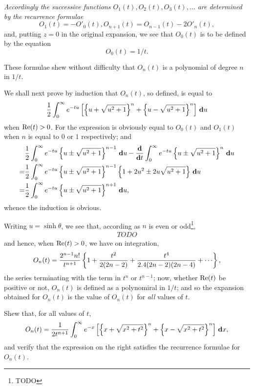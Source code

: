 \documentclass{book}
\begin{document}
%
%
\emph{Accordingly the successive functions $O_1(t), O_2(t), O_3(t),
  \ldots$ are determined by the recurrence formulae}
$$
O_1(t) = -O'_0(t),
O_{n+1}(t) = O_{n-1}(t) - 2O'_n(t),
$$
and, putting $z=0$ in the original expansion, we see that $O_0(t)$ is
to be defined by the equation
$$
O_0(t) = 1/t.
$$

These formulae shew without difficulty that $O_n(t)$ is a polynomial
of degree $n$ in $1/t$.

We shall next prove by induction that $O_n(t)$, so defined, is equal
to
$$
\frac{1}{2}
\int_0^{\infty}
e^{-tu}
\left[ 
  \left\{ u + \sqrt{u^2+1} \right\}^n
  +
  \left\{ u - \sqrt{u^2+1} \right\}^n
 \right]
\, \mathbf{d} u
$$
when $\mathrm{Re}(t) > 0$.
For the expression is obviously equal to $O_0(t)$ and $O_1(t)$ when
$n$ is equal to $0$ or $1$ respectively; and
\begin{align*}
  &
  \frac{1}{2}
  \int_0^{\infty}
  e^{-tu}
  \left\{ u \pm \sqrt{u^2+1} \right\}^{n-1}
  \, \mathbf{d} u
  -
  \frac{\mathbf{d}}{\mathbf{d} t}
  \int_0^{\infty}
  e^{-tu}
  \left\{ u \pm \sqrt{u^2+1} \right\}^{n}
  \, \mathbf{d} u
  \\
  =
  &  
  \frac{1}{2}
  \int_0^{\infty}
  e^{-tu}
  \left\{ u \pm \sqrt{u^2+1} \right\}^{n-1}
  \left\{ 1 + 2u^2 \pm 2u \sqrt{u^2+1} \right\}
  \, \mathbf{d} u
  \\
  =
  &
  \frac{1}{2}
  \int_0^{\infty}
  e^{-tu}
  \left\{ u \pm \sqrt{u^2+1} \right\}^{n+1}
  \, \mathbf{d} u,
\end{align*}
whence the induction is obvious.

Writing $u = \sinh \theta$, we see that, according as $n$ is even or
odd\footnote{TODO},
\begin{align*}
  TODO
\end{align*}
and hence, when $\mathrm{Re}(t) > 0$, we have on integration,
$$
O_n(t)
=
\frac{2^{n-1} n!}{t^{n+1}}
\thebrace{
  1
  + \frac{t^2}{2 (2n-2)}
  + \frac{t^4}{ 2.4 (2n-2)(2n-4)}
  + \cdots
},
$$
the series terminating with the term in $t^n$ or $t^{n-1}$; now,
whether $\mathrm{Re}(t)$ be positive or not,
$O_n(t)$ is defined as a polynomiral in $1/t$; and so the expansion
obtained for $O_n(t)$ is the value of $O_n(t)$ for \emph{all} values
of $t$.
\begin{wandwexample}
  Shew that, for all values of $t$,
  $$
  O_n(t)
  =
  \frac{1}{2 t^{n+1}}
  \int_0^{\infty}
  e^{-x}
  \left[ 
    \left\{ x + \sqrt{x^2 + t^2} \right\}^n
    +
    \left\{ x - \sqrt{x^2 + t^2} \right\}^n
   \right]
  \, \mathbf{d} x,
  $$
  and verify that the expression on the right satisfies the recurrence
  formulae for $O_n(t)$.
\end{wandwexample}
\end{document}
